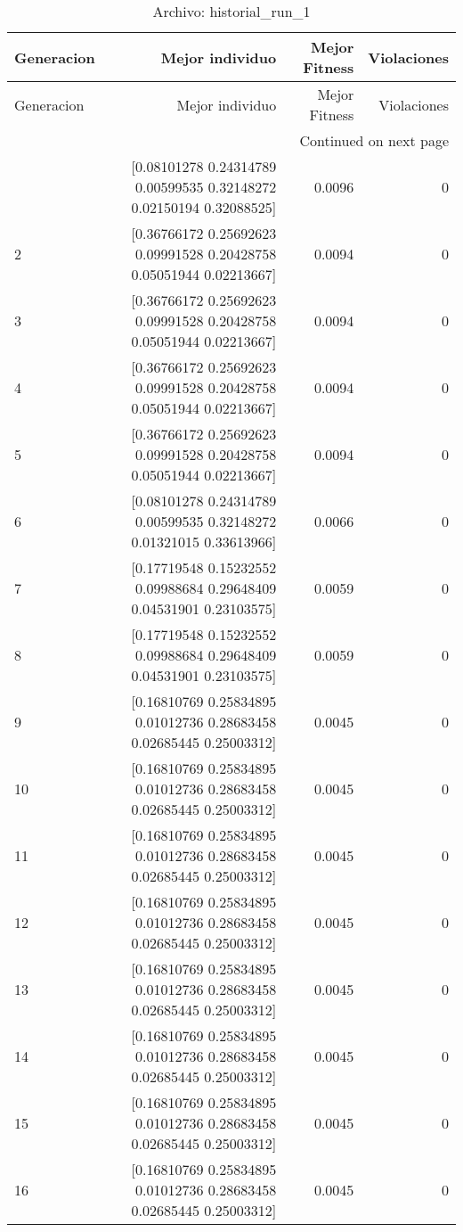 \begin{longtable}{lrrr}
\caption{Archivo: historial\_run\_1}\label{tab:historial_run_1} \\
\toprule
Generacion & Mejor individuo & Mejor Fitness & Violaciones \\
\midrule
\endfirsthead
\toprule
Generacion & Mejor individuo & Mejor Fitness & Violaciones \\
\midrule
\endhead
\midrule
\multicolumn{4}{r}{Continued on next page} \\
\midrule
\endfoot
\bottomrule
\endlastfoot
1 & [0.08101278 0.24314789 0.00599535 0.32148272 0.02150194 0.32088525] & 0.0096 & 0 \\
2 & [0.36766172 0.25692623 0.09991528 0.20428758 0.05051944 0.02213667] & 0.0094 & 0 \\
3 & [0.36766172 0.25692623 0.09991528 0.20428758 0.05051944 0.02213667] & 0.0094 & 0 \\
4 & [0.36766172 0.25692623 0.09991528 0.20428758 0.05051944 0.02213667] & 0.0094 & 0 \\
5 & [0.36766172 0.25692623 0.09991528 0.20428758 0.05051944 0.02213667] & 0.0094 & 0 \\
6 & [0.08101278 0.24314789 0.00599535 0.32148272 0.01321015 0.33613966] & 0.0066 & 0 \\
7 & [0.17719548 0.15232552 0.09988684 0.29648409 0.04531901 0.23103575] & 0.0059 & 0 \\
8 & [0.17719548 0.15232552 0.09988684 0.29648409 0.04531901 0.23103575] & 0.0059 & 0 \\
9 & [0.16810769 0.25834895 0.01012736 0.28683458 0.02685445 0.25003312] & 0.0045 & 0 \\
10 & [0.16810769 0.25834895 0.01012736 0.28683458 0.02685445 0.25003312] & 0.0045 & 0 \\
11 & [0.16810769 0.25834895 0.01012736 0.28683458 0.02685445 0.25003312] & 0.0045 & 0 \\
12 & [0.16810769 0.25834895 0.01012736 0.28683458 0.02685445 0.25003312] & 0.0045 & 0 \\
13 & [0.16810769 0.25834895 0.01012736 0.28683458 0.02685445 0.25003312] & 0.0045 & 0 \\
14 & [0.16810769 0.25834895 0.01012736 0.28683458 0.02685445 0.25003312] & 0.0045 & 0 \\
15 & [0.16810769 0.25834895 0.01012736 0.28683458 0.02685445 0.25003312] & 0.0045 & 0 \\
16 & [0.16810769 0.25834895 0.01012736 0.28683458 0.02685445 0.25003312] & 0.0045 & 0 \\

\end{longtable}
